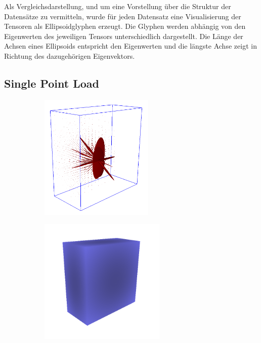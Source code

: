 \documentclass[a4paper,fontsize=12pt,toc=bib,halfparskip]{scrartcl}
\begin{document}
Als Vergleichsdarstellung, und um eine Vorstellung \"uber die Struktur der Datens\"atze zu vermitteln, wurde f\"ur jeden Datensatz eine Visualisierung der Tensoren als Ellipsoidglyphen erzeugt. Die Glyphen werden abh\"angig von den Eigenwerten des jeweiligen Tensors unterschiedlich dargestellt. Die L\"ange der Achsen eines Ellipsoids entspricht den Eigenwerten und die l\"angste Achse zeigt in Richtung des dazugeh\"origen Eigenvektors.

\subsection{Single Point Load}

\begin{figure}
	\begin{subfigure}{0.3\textwidth}
		\centering
		\includegraphics[height=6cm]{pictures/results/SinglePoint_Ellipsoids.png}
		\subcaption{}
		\label{SinglePointEllipsoids}
	\end{subfigure}
	\hspace*{\fill}
	\begin{subfigure}{0.3\textwidth}
		\centering
		\includegraphics[height=6cm]{pictures/results/SinglePoint_Object.png}
		\subcaption{}
		\label{SinglePointObject}
	\end{subfigure}
	\hspace*{\fill}
	\begin{subfigure}{0.3\textwidth}

\end{subfigure}
\end{figure}
\end{document}

